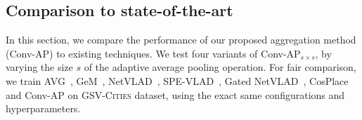 \documentclass{article}
\begin{document}
\subsection{Comparison to state-of-the-art}
\label{sec:exp:sota}
In this section, we compare the performance of our proposed aggregation method (Conv-AP) to existing techniques. We test four variants of Conv-AP$_{s \times s}$, by varying the size $s$ of the adaptive average pooling operation. For fair comparison, we train AVG~\cite{arandjelovic2016netvlad}, GeM~\cite{radenovic2018fine}, NetVLAD~\cite{arandjelovic2016netvlad}, SPE-VLAD~\cite{yu2019spatial}, Gated NetVLAD~\cite{zhang2021vector}, CosPlace~\cite{berton2022rethinking} and Conv-AP on \textsc{GSV-Cities} dataset, using the exact same configurations and hyperparameters.


\setlength{\tabcolsep}{10pt}
\end{document}
